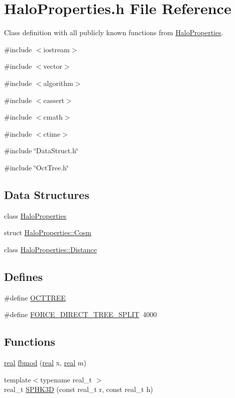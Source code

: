\section{HaloProperties.h File Reference}
\label{HaloProperties_8h}


Class definition with all publicly known functions from \hyperlink{classHaloProperties}{HaloProperties}.  


{\ttfamily \#include $<$iostream$>$}\par
{\ttfamily \#include $<$vector$>$}\par
{\ttfamily \#include $<$algorithm$>$}\par
{\ttfamily \#include $<$cassert$>$}\par
{\ttfamily \#include $<$cmath$>$}\par
{\ttfamily \#include $<$ctime$>$}\par
{\ttfamily \#include \char`\"{}DataStruct.h\char`\"{}}\par
{\ttfamily \#include \char`\"{}OctTree.h\char`\"{}}\par
\subsection*{Data Structures}
\begin{DoxyCompactItemize}
\item 
class \hyperlink{classHaloProperties}{HaloProperties}
\item 
struct \hyperlink{structHaloProperties_1_1Cosm}{HaloProperties::Cosm}
\item 
class \hyperlink{classHaloProperties_1_1Distance}{HaloProperties::Distance}
\end{DoxyCompactItemize}
\subsection*{Defines}
\begin{DoxyCompactItemize}
\item 
\#define \hyperlink{HaloProperties_8h_a690ba77d26036cf5527579144de3086b}{OCTTREE}
\item 
\#define \hyperlink{HaloProperties_8h_aeba9909ecec48c05016e48aec42a9469}{FORCE\_\-DIRECT\_\-TREE\_\-SPLIT}~4000
\end{DoxyCompactItemize}
\subsection*{Functions}
\begin{DoxyCompactItemize}
\item 
\hyperlink{Global_8h_a031f8951175b43076c2084a6c2173410}{real} \hyperlink{HaloProperties_8h_a899f0547561b988f5ed4f2ad3e834cbf}{fbmod} (\hyperlink{Global_8h_a031f8951175b43076c2084a6c2173410}{real} x, \hyperlink{Global_8h_a031f8951175b43076c2084a6c2173410}{real} m)
\item 
{\footnotesize template$<$typename real\_\-t $>$ }\\real\_\-t \hyperlink{HaloProperties_8h_a0cb8e9ba7bd0b1861c15a42aa799dcd4}{SPHK3D} (const real\_\-t r, const real\_\-t h)
\end{DoxyCompactItemize}


